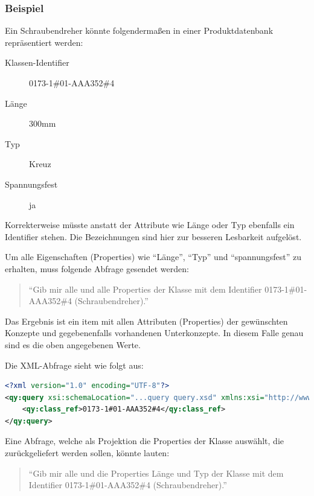 \subsubsection{Beispiel}\label{lab:schraubendreher}

Ein Schraubendreher könnte folgendermaßen in einer Produktdatenbank repräsentiert werden:

\begin{description}
\item[Klassen-Identifier] 0173-1\#01-AAA352\#4 
\item[Länge] 300mm
\item[Typ] Kreuz
\item[Spannungsfest] ja
\end{description}

Korrekterweise müsste anstatt der Attribute wie Länge oder Typ ebenfalls ein Identifier stehen. Die Bezeichnungen sind hier zur besseren Lesbarkeit aufgelöst. 

Um alle Eigenschaften (Properties) wie \enquote{Länge}, \enquote{Typ} und \enquote{spannungsfest} zu erhalten, muss folgende Abfrage gesendet werden: 
\begin{quotation}
\enquote{Gib mir alle  und alle Properties der Klasse mit dem Identifier 0173-1\#01-AAA352\#4 (Schraubendreher).}
\end{quotation}

Das Ergebnis ist ein \gls{item} mit allen Attributen (Properties) der gewünschten Konzepte und gegebenenfalls vorhandenen Unterkonzepte. In diesem Falle genau sind es die oben angegebenen Werte.

Die XML-Abfrage sieht wie folgt aus:

\begin{lstlisting}[caption=Query Beispiel - alle Daten abfragen, language=XML, label=UseCaseDatenabfragen]
<?xml version="1.0" encoding="UTF-8"?>
<qy:query xsi:schemaLocation="...query query.xsd" xmlns:xsi="http://www.w3.org/2001/XMLSchema-instance" xmlns:cat="...catalogue" xmlns:val="...value" xmlns:qy="...query" xmlns:bas="...basic">
	<qy:class_ref>0173-1#01-AAA352#4</qy:class_ref>
</qy:query>
\end{lstlisting}

Eine Abfrage, welche als Projektion die Properties der Klasse auswählt, die zurückgeliefert werden sollen, könnte lauten: 
\begin{quotation}
\enquote{Gib mir alle  und die Properties Länge und Typ der Klasse mit dem Identifier 0173-1\#01-AAA352\#4 (Schraubendreher).}
\end{quotation}

